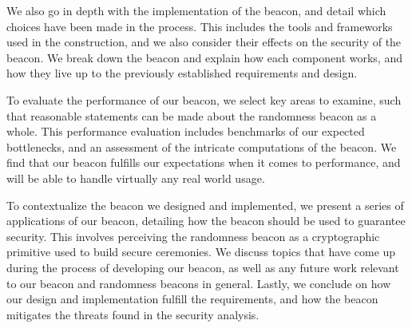 We also go in depth with the implementation of the beacon, and detail which choices have been made in the process.
This includes the tools and frameworks used in the construction, and we also consider their effects on the security of the beacon.
We break down the beacon and explain how each component works, and how they live up to the previously established requirements and design.

\bigskip\noindent
To evaluate the performance of our beacon, we select key areas to examine, such that reasonable statements can be made about the randomness beacon as a whole.
This performance evaluation includes benchmarks of our expected bottlenecks, and an assessment of the intricate computations of the beacon.
We find that our beacon fulfills our expectations when it comes to performance, and will be able to handle virtually any real world usage.

To contextualize the beacon we designed and implemented, we present a series of applications of our beacon, detailing how the beacon should be used to guarantee security.
This involves perceiving the randomness beacon as a cryptographic primitive used to build secure ceremonies.
We discuss topics that have come up during the process of developing our beacon, as well as any future work relevant to our beacon and randomness beacons in general.
Lastly, we conclude on how our design and implementation fulfill the requirements, and how the beacon mitigates the threats found in the security analysis.

